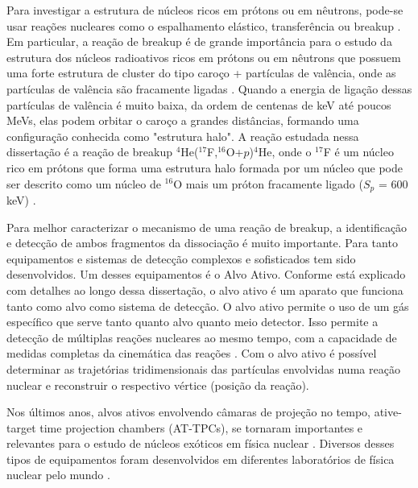 \documentclass[a4paper,12pt,oneside]{book}
\begin{document}
\par Para investigar a estrutura de núcleos ricos em prótons ou em nêutrons, pode-se usar reações nucleares como o espalhamento elástico, transferência ou breakup \cite{Kolata2016}. Em particular, a reação de breakup é de grande importância para o estudo da estrutura dos núcleos radioativos ricos em prótons ou em nêutrons que possuem uma forte estrutura de cluster do tipo caroço + partículas de valência, onde as partículas de valência são fracamente ligadas \cite{Kolata2016, MORO_BREAKUP}. Quando a energia de ligação dessas partículas de valência é muito baixa, da ordem de centenas de keV até poucos MeVs, elas podem orbitar o caroço a grandes distâncias, formando uma configuração conhecida como "estrutura halo". A reação estudada nessa dissertação é a reação de breakup $^4$He($^{17}$F,$^{16}$O+$p$)$^4$He, onde o $^{17}$F é um núcleo rico em prótons que forma uma estrutura halo formada por um núcleo que pode ser descrito como um núcleo de $^{16}$O mais um próton fracamente ligado ($S_p$ = 600 keV) \cite{MORO_BREAKUP}.

\par Para melhor caracterizar o mecanismo de uma reação de breakup, a identificação e detecção de ambos fragmentos da dissociação é muito importante. Para tanto equipamentos e sistemas de detecção complexos e sofisticados tem sido desenvolvidos. Um desses equipamentos é o Alvo Ativo. Conforme está explicado com detalhes ao longo dessa dissertação, o alvo ativo é um aparato que funciona tanto como alvo como sistema de detecção. O alvo ativo permite o uso de um gás específico que serve tanto quanto alvo quanto meio detector. Isso permite a detecção de múltiplas reações nucleares ao mesmo tempo, com a capacidade de medidas completas da cinemática das reações \cite{FORTINO2022166497, josh_bradt, attpc}. Com o alvo ativo é possível determinar as trajetórias tridimensionais das partículas envolvidas numa reação nuclear e reconstruir o respectivo vértice (posição da reação).





\par Nos últimos anos, alvos ativos envolvendo câmaras de projeção no tempo, ative-target time projection chambers (AT-TPCs), se tornaram importantes e relevantes para o estudo de núcleos exóticos em física nuclear \cite{FORTINO2022166497}. Diversos desses tipos de equipamentos foram desenvolvidos em diferentes laboratórios de física nuclear pelo mundo \cite{attpc, FURUNO2018215, KOSHCHIY2020163398}.
\end{document}

